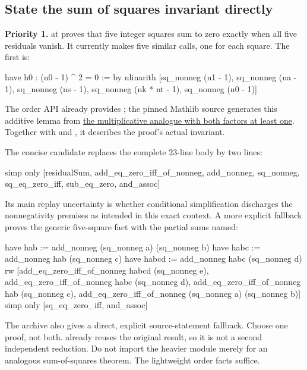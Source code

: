 \subsection{State the sum of squares invariant directly}
\label{sec:squares}

\textbf{Priority 1.}  at
 proves that five integer squares sum to zero
exactly when all five residuals vanish. It currently makes five similar
 calls, one for each square. The first is:

\begin{Lean}
  have h0 : (n0 - 1) ^ 2 = 0 := by
    nlinarith [sq_nonneg (n1 - 1), sq_nonneg (na - 1),
      sq_nonneg (ns - 1), sq_nonneg (nk * nt - 1),
      sq_nonneg (n0 - 1)]
\end{Lean}

\existing{} The order API already provides
; the pinned Mathlib source generates this
additive lemma from
\href{https://github.com/leanprover-community/mathlib4/blob/81a5d257c8e410db227a6665ed08f64fea08e997/Mathlib/Algebra/Order/Monoid/Unbundled/Basic.lean\#L1070-L1081}{the multiplicative analogue with both factors at least one}.
Together with  and , it describes
the proof's actual invariant.

The concise candidate replaces the complete 23-line body by two lines:

\begin{Lean}
  simp only [residualSum, add_eq_zero_iff_of_nonneg, add_nonneg,
    sq_nonneg, sq_eq_zero_iff, sub_eq_zero, and_assoc]
\end{Lean}

Its main replay uncertainty is whether conditional simplification discharges
the nonnegativity premises as intended in this exact context. A more explicit
fallback proves the generic five-square fact with the partial sums named:

\begin{Lean}
  have hab := add_nonneg (sq_nonneg a) (sq_nonneg b)
  have habc := add_nonneg hab (sq_nonneg c)
  have habcd := add_nonneg habc (sq_nonneg d)
  rw [add_eq_zero_iff_of_nonneg habcd (sq_nonneg e),
    add_eq_zero_iff_of_nonneg habc (sq_nonneg d),
    add_eq_zero_iff_of_nonneg hab (sq_nonneg c),
    add_eq_zero_iff_of_nonneg (sq_nonneg a) (sq_nonneg b)]
  simp only [sq_eq_zero_iff, and_assoc]
\end{Lean}

The archive also gives a direct, explicit source-statement fallback. Choose
one proof, not both.  already reuses the
original result, so it is not a second independent reduction. Do not import
the heavier  module merely for an analogous
sum-of-squares theorem. The lightweight order facts suffice.

